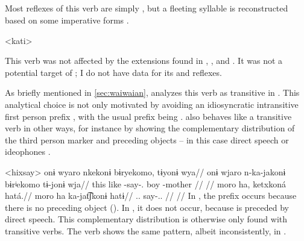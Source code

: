 \subsection{ }
\label{sec:say}
Most reflexes of this verb are simply , but a fleeting syllable  is reconstructed based on some imperative forms .

\pex<kati> \PC {} 
\a \apalai {} \parencite[35]{koehn1986apalai}
\a \wayana {} \parencite[181]{wayanatavares2005}
\a \hixka {} \parencite[128]{hixkaryanaderby1985}
\a \panare {} \parencite[102]{mattei1994diccionario}
\xe

This verb was not affected by the extensions found in \PPek, \PWai, and \PTir.
It was not a potential target of \akuriyo {}; I do not have data for its \carijo and \yukpa reflexes.

As briefly mentioned in \cref{sec:waiwaian}, \textcite{hixkaryanaderby1985} analyzes this verb as transitive in \hixka.
This analytical choice is not only motivated by avoiding an idiosyncratic intransitive first person prefix , with the usual prefix being .
\hixka {} also behaves like a transitive verb in other ways, for instance by showing the complementary distribution of the third person marker  and preceding objects -- in this case direct speech or ideophones .

\pex<hixsay>\hixka
{}
\begingl
\glpreamble onɨ wyaro nkekonɨ bɨryekomo, tɨyonɨ wya//
\gla onɨ wjaro n-ka-jakonɨ bɨrʲekomo tɨ-jonɨ wja//
\glb this like -say-. boy -mother //
\glft {} \parencite[][36]{hixkaryanaderby1985}//
\endgl
{}
\begingl
\glpreamble moro ha, ketxkoná hatá.//
\gla moro ha ka-jat͡ʃkonɨ hatɨ//
\glb {}..  say-.. //
\glft {} \parencite[][14]{derbyshire1965textos}//
\endgl
\xe
In , the prefix  occurs because there is no preceding object ().
In , it does not occur, because  is preceded by direct speech.
This complementary distribution is otherwise only found with transitive verbs.
The verb shows the same pattern, albeit inconsistently, in \trio \parencite[267]{triocarlin2004}.


